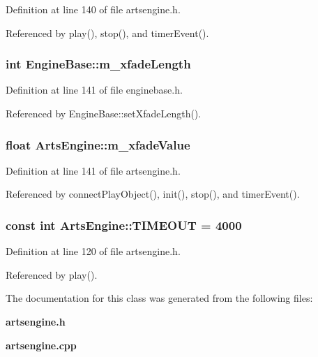 Definition at line 140 of file artsengine.h.

Referenced by play(), stop(), and timer\-Event().
\subsubsection{\setlength{\rightskip}{0pt plus 5cm}int {\bf Engine\-Base::m\_\-xfade\-Length}\hspace{0.3cm}{\tt  [protected, inherited]}}\label{classEngineBase_EngineBasep2}




Definition at line 141 of file enginebase.h.

Referenced by Engine\-Base::set\-Xfade\-Length().
\subsubsection{\setlength{\rightskip}{0pt plus 5cm}float {\bf Arts\-Engine::m\_\-xfade\-Value}\hspace{0.3cm}{\tt  [private]}}\label{classArtsEngine_ArtsEnginer15}




Definition at line 141 of file artsengine.h.

Referenced by connect\-Play\-Object(), init(), stop(), and timer\-Event().
\subsubsection{\setlength{\rightskip}{0pt plus 5cm}const int {\bf Arts\-Engine::TIMEOUT} = 4000\hspace{0.3cm}{\tt  [static, private]}}\label{classArtsEngine_ArtsEnginev1}




Definition at line 120 of file artsengine.h.

Referenced by play().

The documentation for this class was generated from the following files:\begin{CompactItemize}
\item 
{\bf artsengine.h}\item 
{\bf artsengine.cpp}\end{CompactItemize}
